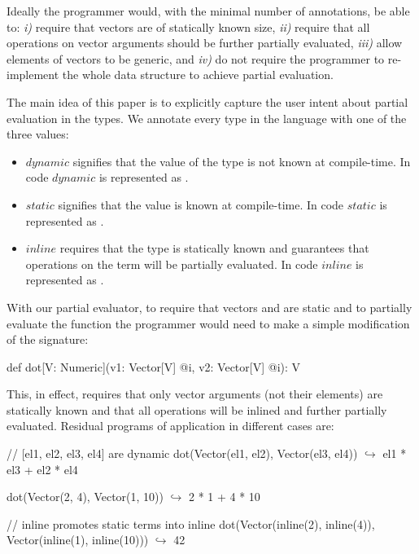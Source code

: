 Ideally the programmer would, with the minimal number of annotations, be able to: \emph{i)} require
that   vectors are of statically known size, \emph{ii)} require that all operations on
vector arguments should be further partially evaluated, \emph{iii)} allow elements of
vectors to be generic, and \emph{iv)} do not require the programmer to re-implement
the whole  data structure to achieve partial evaluation.

The main idea of this paper is to explicitly capture the user intent about partial
evaluation in the types. We annotate every type in the language with one of the three values:
\begin{itemize}
 \item $dynamic$ signifies that the value of the type is not known at compile-time. In code $dynamic$ is represented as .
 \item $static$ signifies that the value is known at compile-time. In code $static$ is represented as .
 \item $inline$ requires that the type is statically known and guarantees that operations on the term will be partially evaluated. In code $inline$ is represented as .
\end{itemize}

With our partial evaluator, to require that vectors  and  are static and
to partially evaluate the function the programmer would need to make a simple modification of
the  signature:
\vspace{1.8mm}
\begin{listing}
  def dot[V: Numeric](v1: Vector[V] @i, v2: Vector[V] @i): V
\end{listing}
\vspace{1.8mm}
This, in effect, requires that only vector arguments (not their elements) are statically known and that all operations will be inlined and further partially evaluated. Residual programs of  application in different cases are:

\vspace{1.8mm}
\begin{listing}[mathescape]
  // [el1, el2, el3, el4] are dynamic
  dot(Vector(el1, el2), Vector(el3, el4))
    $\hookrightarrow$ el1 * el3 + el2 * el4

  dot(Vector(2, 4), Vector(1, 10))
    $\hookrightarrow$ 2 * 1 + 4 * 10

  // inline promotes static terms into inline
  dot(Vector(inline(2), inline(4)), Vector(inline(1), inline(10)))
    $\hookrightarrow$ 42
\end{listing}
\vspace{1.8mm}

